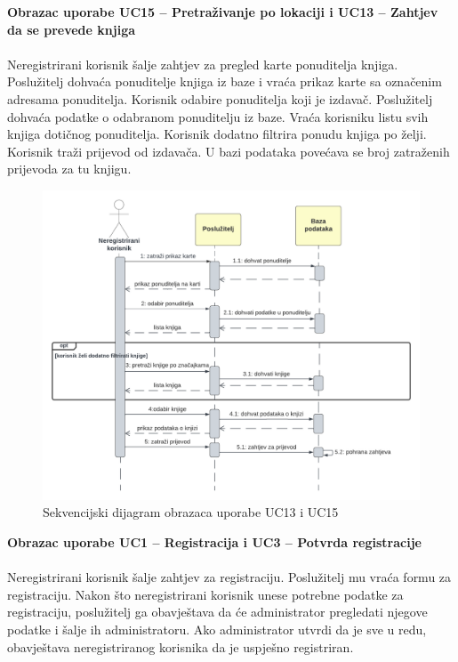 				\textbf{Obrazac uporabe UC15 – Pretraživanje po lokaciji i UC13 – Zahtjev da se prevede knjiga}\\\\
				Neregistrirani korisnik šalje zahtjev za pregled karte ponuditelja knjiga. Poslužitelj dohvaća ponuditelje knjiga iz baze i vraća prikaz karte sa označenim adresama ponuditelja. Korisnik odabire ponuditelja koji je izdavač. Poslužitelj dohvaća podatke o odabranom ponuditelju iz baze. Vraća korisniku listu svih knjiga dotičnog ponuditelja. Korisnik dodatno filtrira ponudu knjiga po želji. Korisnik traži prijevod od izdavača. U bazi podataka povećava se broj zatraženih prijevoda za tu knjigu.\\
				
				\begin{figure}[h]
					\centering
					\includegraphics[width = \textwidth]{slike/sekvUC15UC13.PNG}
					\caption{Sekvencijski dijagram obrazaca uporabe UC13 i UC15}
					\label{fig:enter-label}
				\end{figure}
				\eject
				
				\textbf{Obrazac uporabe UC1 – Registracija i UC3 – Potvrda registracije}\\\\
				Neregistrirani korisnik šalje zahtjev za registraciju. Poslužitelj mu vraća formu za registraciju. Nakon što neregistrirani korisnik unese potrebne podatke za registraciju, poslužitelj ga obavještava da će administrator pregledati njegove podatke i šalje ih administratoru. Ako administrator utvrdi da je sve u redu, obavještava neregistriranog korisnika da je uspješno registriran.\\
				
